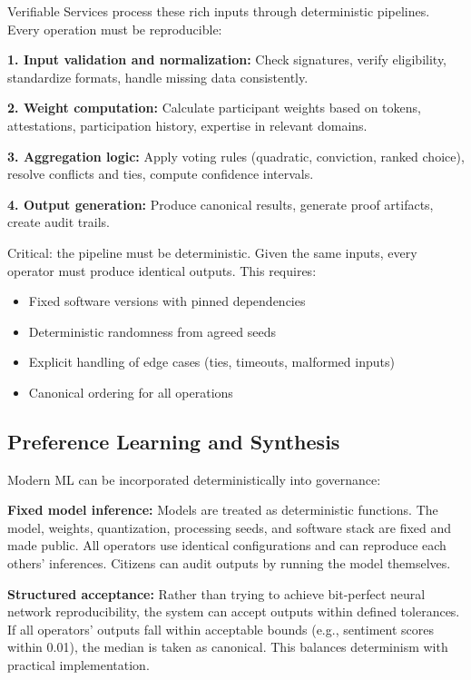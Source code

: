 Verifiable Services process these rich inputs through deterministic pipelines. Every operation must be reproducible:

\textbf{1. Input validation and normalization:} Check signatures, verify eligibility, standardize formats, handle missing data consistently.

\textbf{2. Weight computation:} Calculate participant weights based on tokens, attestations, participation history, expertise in relevant domains.

\textbf{3. Aggregation logic:} Apply voting rules (quadratic, conviction, ranked choice), resolve conflicts and ties, compute confidence intervals.

\textbf{4. Output generation:} Produce canonical results, generate proof artifacts, create audit trails.

Critical: the pipeline must be deterministic. Given the same inputs, every operator must produce identical outputs. This requires:

\begin{itemize}
\item Fixed software versions with pinned dependencies
\item Deterministic randomness from agreed seeds
\item Explicit handling of edge cases (ties, timeouts, malformed inputs)
\item Canonical ordering for all operations
\end{itemize}

\subsection{Preference Learning and Synthesis}

Modern ML can be incorporated deterministically into governance:

\textbf{Fixed model inference:} Models are treated as deterministic functions. The model, weights, quantization, processing seeds, and software stack are fixed and made public. All operators use identical configurations and can reproduce each others' inferences. Citizens can audit outputs by running the model themselves.

\textbf{Structured acceptance:} Rather than trying to achieve bit-perfect neural network reproducibility, the system can accept outputs within defined tolerances. If all operators' outputs fall within acceptable bounds (e.g., sentiment scores within 0.01), the median is taken as canonical. This balances determinism with practical implementation.

